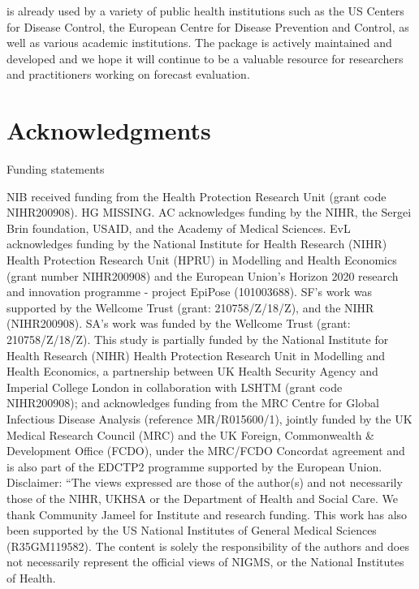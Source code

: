 \documentclass[
]{jss}
\begin{document}
 is already used by a variety of public health
institutions such as the US Centers for Disease Control, the European
Centre for Disease Prevention and Control, as well as various academic
institutions. The package is actively maintained and developed and we
hope it will continue to be a valuable resource for researchers and
practitioners working on forecast evaluation.

\section{Acknowledgments}\label{acknowledgments}

Funding statements

NIB received funding from the Health Protection Research Unit (grant
code NIHR200908). HG MISSING. AC acknowledges funding by the NIHR, the
Sergei Brin foundation, USAID, and the Academy of Medical Sciences. EvL
acknowledges funding by the National Institute for Health Research
(NIHR) Health Protection Research Unit (HPRU) in Modelling and Health
Economics (grant number NIHR200908) and the European Union's Horizon
2020 research and innovation programme - project EpiPose (101003688).
SF's work was supported by the Wellcome Trust (grant: 210758/Z/18/Z),
and the NIHR (NIHR200908). SA's work was funded by the Wellcome Trust
(grant: 210758/Z/18/Z). This study is partially funded by the National
Institute for Health Research (NIHR) Health Protection Research Unit in
Modelling and Health Economics, a partnership between UK Health Security
Agency and Imperial College London in collaboration with LSHTM (grant
code NIHR200908); and acknowledges funding from the MRC Centre for
Global Infectious Disease Analysis (reference MR/R015600/1), jointly
funded by the UK Medical Research Council (MRC) and the UK Foreign,
Commonwealth \& Development Office (FCDO), under the MRC/FCDO Concordat
agreement and is also part of the EDCTP2 programme supported by the
European Union. Disclaimer: ``The views expressed are those of the
author(s) and not necessarily those of the NIHR, UKHSA or the Department
of Health and Social Care. We thank Community Jameel for Institute and
research funding. This work has also been supported by the US National
Institutes of General Medical Sciences (R35GM119582). The content is
solely the responsibility of the authors and does not necessarily
represent the official views of NIGMS, or the National Institutes of
Health.


\end{document}
